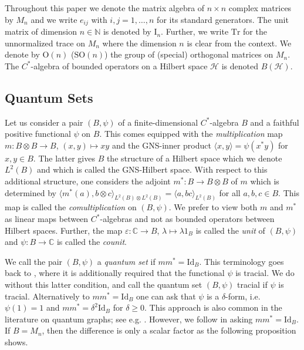 \documentclass{amsart}
\newcommand{\C}{\mathbb{C}}
\newcommand{\N}{\mathbb{N}}
\begin{document}
Throughout this paper we denote the matrix algebra of $n \times n$ complex matrices by $M_n$ and we write $e_{ij}$ with $i,j = 1, \dots, n$ for its standard generators. The unit matrix of dimension $n\in\N$ is denoted by $\mathrm{I}_n$. Further, we write $\mathrm{Tr}$ for the unnormalized trace on $M_n$ where the dimension $n$ is clear from the context. We denote by $\mathrm{O}(n)$ ($\mathrm{SO}(n)$) the group of (special) orthogonal matrices on $M_n$. The $C^\ast$-algebra of bounded operators on a Hilbert space $\mathcal{H}$ is denoted $B(\mathcal{H})$.


\subsection{Quantum Sets}
\label{sec::pre:quantum_sets}

Let us consider a pair $(B, \psi)$ of a finite-dimensional $C^\ast$-algebra $B$ and a faithful positive functional $\psi$ on $B$. This comes equipped with the \emph{multiplication} map $m: B \otimes B \to B$, $(x,y) \mapsto xy$ and the GNS-inner product $\langle x, y \rangle = \psi(x^\ast y)$ for $x,y \in B$. The latter gives $B$ the structure of a Hilbert space which we denote $L^2(B)$ and which is called the GNS-Hilbert space. With respect to this additional structure, one considers the adjoint $m^\ast: B \to B \otimes B$ of $m$ which is determined by $\langle m^\ast(a), b \otimes c\rangle_{L^2(B) \otimes L^2(B)} = \langle a, bc \rangle_{L^2(B)}$ for all $a, b, c \in B$. This map is called the \emph{comultiplication} on $(B, \psi)$. We prefer to view both $m$ and $m^\ast$ as linear maps between $C^\ast$-algebras and not as bounded operators between Hilbert spaces. Further, the map $\varepsilon: \C \to B$, $\lambda \mapsto \lambda 1_B$ is called the \emph{unit} of $(B, \psi)$ and $\psi: B \to \C$ is called the \emph{counit}.



We call the pair $(B, \psi)$ a \emph{quantum set} if $m m^\ast = \mathrm{Id}_B$. This terminology goes back to \cite[Terminology 3.1]{musto_compositional_2018}, where it is additionally required that the functional $\psi$ is tracial. We do without this latter condition, and call the quantum set $(B, \psi)$ tracial if $\psi$ is tracial. Alternatively to $m m^\ast = \mathrm{Id}_B$ one can ask that $\psi$ is a $\delta$-form, i.e. $\psi(1) = 1$ and $m m^\ast = \delta^2 \mathrm{Id}_B$ for $\delta \geq 0$. This approach is also common in the literature on quantum graphs; see e.g. \cite{daws_quantum_2024,matsuda_classification_2022,gromada_examples_2022,brannan_bigalois_2020,brannan_quantum_2022}. However, we follow \cite{daws_quantum_2024,wasilewski_quantum_2024} in asking $m m^\ast = \mathrm{Id}_B$. If $B = M_n$, then the difference is only a scalar factor as the following proposition shows.
\end{document}

